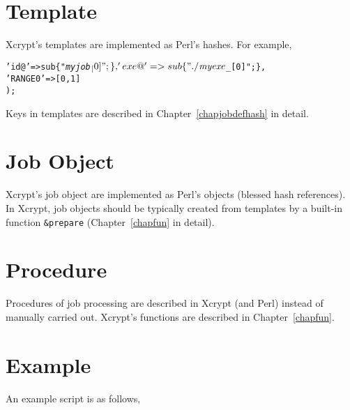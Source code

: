 \documentclass[a4paper,10pt]{report}
\begin{document}
\section{Template}

Xcrypt's templates are implemented as Perl's hashes.  For example,
\begin{boxnote}
\begin{alltt}
%template = (
 'id@' => sub \{ "\textit{myjob}$_[0]"; \},
 'exe@' => sub \{ "./\textit{myexe} $_[0]"; \},
 'RANGE0' => [0,1]
);
\end{alltt}
\end{boxnote}
\vspace{\baselineskip}

Keys in templates are described in Chapter~\ref{chapjobdefhash} in
detail.

\section{Job Object}

Xcrypt's job object are implemented as Perl's objects (blessed hash
references).  In Xcrypt, job objects should be typically created from
templates by a built-in function \texttt{\&prepare}
(Chapter~\ref{chapfun} in detail).


\section{Procedure}

Procedures of job processing are described in Xcrypt (and Perl)
instead of manually carried out.
Xcrypt's functions are described in Chapter~\ref{chapfun}.

\section{Example}\label{secscriptexample}

An example script is as follows,
\end{document}

